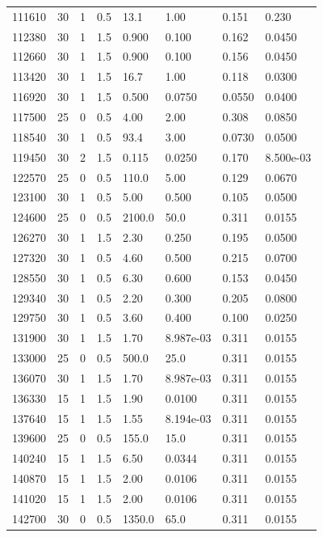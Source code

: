 \documentclass[preview]{standalone}
\begin{document}
{{{{\begin{tabular}{L{1.2cm}C{1.2cm} C{0.3cm}C{0.5cm} C{1.4cm}C{1.4cm} C{1.4cm}C{1.4cm}}
  111610  &    30  & 1     & 0.5 &  13.1  & 1.00  & 0.151 &  0.230   \\ 
  112380  &    30  & 1     & 1.5 &  0.900  & 0.100  & 0.162 &  0.0450   \\ 
  112660  &    30  & 1     & 1.5 &  0.900  & 0.100  & 0.156 &  0.0450   \\ 
  113420  &    30  & 1     & 1.5 &  16.7  & 1.00  & 0.118 &  0.0300   \\ 
  116920  &    30  & 1     & 1.5 &  0.500  & 0.0750  & 0.0550 &  0.0400   \\ 
  117500  &    25  & 0     & 0.5 &  4.00  & 2.00  & 0.308 &  0.0850   \\ 
  118540  &    30  & 1     & 0.5 &  93.4  & 3.00  & 0.0730 &  0.0500   \\ 
  119450  &    30  & 2     & 1.5 &  0.115  & 0.0250  & 0.170 &  8.500e-03   \\ 
  122570  &    25  & 0     & 0.5 &  110.0  & 5.00  & 0.129 &  0.0670   \\ 
  123100  &    30  & 1     & 0.5 &  5.00  & 0.500  & 0.105 &  0.0500   \\ 
  124600  &    25  & 0     & 0.5 &  2100.0  & 50.0  & 0.311 &  0.0155   \\ 
  126270  &    30  & 1     & 1.5 &  2.30  & 0.250  & 0.195 &  0.0500   \\ 
  127320  &    30  & 1     & 0.5 &  4.60  & 0.500  & 0.215 &  0.0700   \\ 
  128550  &    30  & 1     & 0.5 &  6.30  & 0.600  & 0.153 &  0.0450   \\ 
  129340  &    30  & 1     & 0.5 &  2.20  & 0.300  & 0.205 &  0.0800   \\ 
  129750  &    30  & 1     & 0.5 &  3.60  & 0.400  & 0.100 &  0.0250   \\ 
  131900  &    30  & 1     & 1.5 &  1.70  & 8.987e-03  & 0.311 &  0.0155   \\ 
  133000  &    25  & 0     & 0.5 &  500.0  & 25.0  & 0.311 &  0.0155   \\ 
  136070  &    30  & 1     & 1.5 &  1.70  & 8.987e-03  & 0.311 &  0.0155   \\ 
  136330  &    15  & 1     & 1.5 &  1.90  & 0.0100  & 0.311 &  0.0155   \\ 
  137640  &    15  & 1     & 1.5 &  1.55  & 8.194e-03  & 0.311 &  0.0155   \\ 
  139600  &    25  & 0     & 0.5 &  155.0  & 15.0  & 0.311 &  0.0155   \\ 
  140240  &    15  & 1     & 1.5 &  6.50  & 0.0344  & 0.311 &  0.0155   \\ 
  140870  &    15  & 1     & 1.5 &  2.00  & 0.0106  & 0.311 &  0.0155   \\ 
  141020  &    15  & 1     & 1.5 &  2.00  & 0.0106  & 0.311 &  0.0155   \\ 
  142700  &    30  & 0     & 0.5 &  1350.0  & 65.0  & 0.311 &  0.0155   \\ 
\hline 
\end{tabular} 

}}}}
\end{document}
